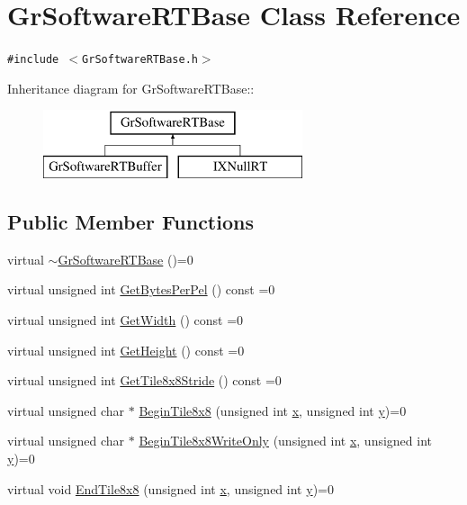\hypertarget{class_gr_software_r_t_base}{
\section{GrSoftwareRTBase Class Reference}
\label{class_gr_software_r_t_base}
}
{\tt \#include $<$GrSoftwareRTBase.h$>$}

Inheritance diagram for GrSoftwareRTBase::\begin{figure}[H]
\begin{center}
\leavevmode
\includegraphics[height=2cm]{class_gr_software_r_t_base}
\end{center}
\end{figure}
\subsection*{Public Member Functions}
\begin{CompactItemize}
\item 
virtual \hyperlink{class_gr_software_r_t_base_6858a3d2fcc6702636a224dfc562453e}{$\sim$GrSoftwareRTBase} ()=0
\item 
virtual unsigned int \hyperlink{class_gr_software_r_t_base_24d6fc1742e612d9fa304e2264bd9dd8}{GetBytesPerPel} () const =0
\item 
virtual unsigned int \hyperlink{class_gr_software_r_t_base_f1b868a5ca1e7444a44c280e76bd802d}{GetWidth} () const =0
\item 
virtual unsigned int \hyperlink{class_gr_software_r_t_base_28d12d92fea7b0a5891123fe7d5dfc74}{GetHeight} () const =0
\item 
virtual unsigned int \hyperlink{class_gr_software_r_t_base_9ed681a9c06bd9657f75e7590bfee5ac}{GetTile8x8Stride} () const =0
\item 
virtual unsigned char $\ast$ \hyperlink{class_gr_software_r_t_base_327778f4649ef0ac403a2eb9fde3031d}{BeginTile8x8} (unsigned int \hyperlink{wglext_8h_d77deca22f617d3f0e0eb786445689fc}{x}, unsigned int \hyperlink{wglext_8h_9298c7ad619074f5285b32c6b72bfdea}{y})=0
\item 
virtual unsigned char $\ast$ \hyperlink{class_gr_software_r_t_base_8105b579f48de033a1f78c98b843d3e9}{BeginTile8x8WriteOnly} (unsigned int \hyperlink{wglext_8h_d77deca22f617d3f0e0eb786445689fc}{x}, unsigned int \hyperlink{wglext_8h_9298c7ad619074f5285b32c6b72bfdea}{y})=0
\item 
virtual void \hyperlink{class_gr_software_r_t_base_152b9d2964518f0c50ff8ced3f3da097}{EndTile8x8} (unsigned int \hyperlink{wglext_8h_d77deca22f617d3f0e0eb786445689fc}{x}, unsigned int \hyperlink{wglext_8h_9298c7ad619074f5285b32c6b72bfdea}{y})=0
\end{CompactItemize}


